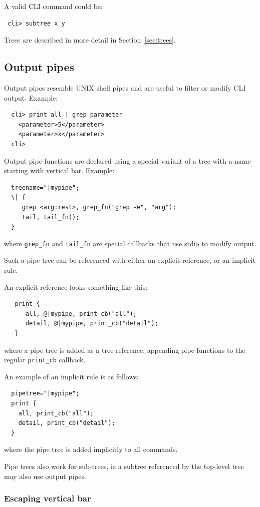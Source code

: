 \documentclass[a4paper, 10pt] {article}
\begin{document}
A valid CLI command could be:
\begin{verbatim}
 cli> subtree x y
\end{verbatim}

Trees are described in more detail in Section~\ref{sec:trees}.

\subsection{Output pipes}
\label{sec:pipes}

Output pipes resemble UNIX shell pipes and are useful to filter or modify CLI output. Example:
\begin{verbatim}
  cli> print all | grep parameter
    <parameter>5</parameter>
    <parameter>x</parameter>
  cli>
\end{verbatim}

Output pipe functions are declared using a special variant of a tree
with a name starting with vertical bar. Example:
\begin{verbatim}
  treename="|mypipe";
  \| { 
     grep <arg:rest>, grep_fn("grep -e", "arg");
     tail, tail_fn();
  }
\end{verbatim}
where {\tt grep\_fn} and {\tt tail\_fn} are special callbacks that use stdio to modify output.

Such a pipe tree can be referenced with either an explicit reference, or an implicit rule.

An explicit reference looks something like this:
\begin{verbatim}
   print {     
      all, @|mypipe, print_cb("all");
      detail, @|mypipe, print_cb("detail");
   }
\end{verbatim}
where a pipe tree is added as a tree reference, appending pipe functions to the regular {\tt print\_cb} callback.

An example of an implicit rule is as follows:
\begin{verbatim}
  pipetree="|mypipe";
  print {
    all, print_cb("all");
    detail, print_cb("detail");
  }
\end{verbatim}
where the pipe tree is added implicitly to all commands.

Pipe trees also work for sub-trees, ie a subtree referenced by the top-level tree may also use output pipes.

\subsubsection{Escaping vertical bar}
\end{document}
